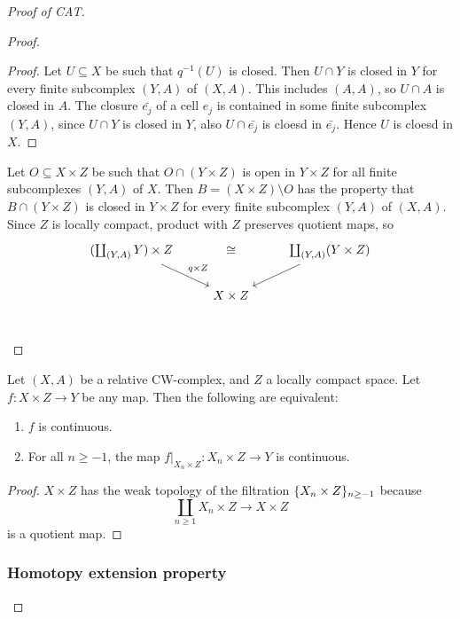 \documentclass{TemplateLecture}
\begin{document}
\begin{proof}[Proof of CAT]
\begin{proof}
\begin{description}
\begin{proof}
                Let \(U\subseteq X\) be such that \(q^{-1}(U)\) is closed. Then \(U\cap Y\) is closed in \(Y\) for every finite subcomplex \((Y,A)\) of \((X,A)\). This includes \((A,A)\), so \(U\cap A\) is closed in \(A\). The closure \(\bar{e_j}\) of a cell \(e_j\) is contained in some finite subcomplex \((Y,A)\), since \(U\cap Y\) is closed in \(Y\), also \(U\cap \bar{e_j}\) is cloesd in \(\bar{e_j}\). Hence \(U\) is cloesd in \(X\).
            \end{proof}
            Let \(O\subseteq X\times Z\) be such that \(O \cap (Y \times Z)\) is open in \(Y \times Z\) for all finite subcomplexes \((Y,A)\) of \(X\). Then \(B = (X\times Z)\setminus O\) has the property that \(B\cap (Y\times Z)\) is closed in \(Y\times Z\) for every finite subcomplex \((Y,A)\) of \((X,A)\). Since \(Z\) is locally compact, product with \(Z\) preserves quotient maps, so
            \[\begin{tikzcd}
                (\coprod_{(Y,A)} Y) \times Z \ar[dr, "q\times Z"] \ar[rr, phantom, "\cong"] && \coprod_{(Y,A)} (Y \times Z) \ar[dl] \\
                & X\times Z & \\
            \end{tikzcd}\]
        \end{description}
    \end{proof}

    \begin{corollary}
        Let \((X,A)\) be a relative CW-complex, and \(Z\) a locally compact space. Let \(f\colon X\times Z \to Y\) be any map. Then the following are equivalent:
        \begin{enumerate}
            \item \(f\) is continuous.
            \item For all \(n \geq -1\), the map \(f\rvert_{X_n \times Z}\colon X_n \times Z \to Y\) is continuous.
        \end{enumerate}
    \end{corollary}
    \begin{proof}
        \(X\times Z\) has the weak topology of the filtration \(\{X_n \times Z\}_{n \geq -1}\) because
        \[\coprod_{n \geq 1} X_n \times Z \to X \times Z\]
        is a quotient map.
    \end{proof}

    \subsubsection{Homotopy extension property}


\end{proof}
\end{document}
